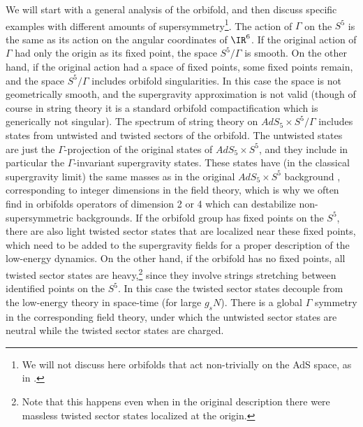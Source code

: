 We will start with a general analysis of the orbifold, and then discuss
specific examples with different amounts of supersymmetry\footnote{
We will not discuss here orbifolds that act non-trivially
on the AdS space, as in
\cite{Gao:1999er}.}. The action
of $\Gamma$ on the $S^5$ is the same as its action on the angular
coordinates of $\IR^6$. If the original action of $\Gamma$ had only
the origin as its fixed point, the space $S^5/\Gamma$ is smooth. On
the other hand, if the original action had a space of fixed points,
some fixed points remain, and the space $S^5/\Gamma$ includes orbifold
singularities. In this case the space is not geometrically smooth, and
the supergravity approximation is not valid (though of course in
string theory it is a standard orbifold compactification which is 
generically not
singular). The spectrum of string theory on $AdS_5\times S^5/\Gamma$
includes states from untwisted and twisted sectors of the
orbifold. The untwisted states are just the $\Gamma$-projection of the
original states of $AdS_5\times S^5$, and they include in particular
the $\Gamma$-invariant supergravity states. These states have (in the
classical supergravity limit) the same masses as in the original
$AdS_5\times S^5$ background \cite{Oz:1998of}, 
corresponding to integer dimensions in
the field theory, which is why we often find in orbifolds operators of
dimension 2 or 4 which can destabilize non-supersymmetric
backgrounds. If the orbifold group has fixed points on the $S^5$,
there are also light twisted sector states that are localized near
these fixed points, which need to be added to the supergravity fields
for a proper description of the low-energy dynamics. On the other
hand, if the orbifold has no fixed points, all twisted sector states
are heavy,\footnote{ Note that this happens even when in the original
description there were massless twisted sector states localized at the
origin.} since they involve strings stretching between identified
points on the $S^5$. In this case the twisted sector states decouple
from the low-energy theory in space-time (for large $g_s N$). There is a global
$\Gamma$ symmetry in the corresponding field theory, under which the
untwisted sector states are neutral while the twisted sector states
are charged.

